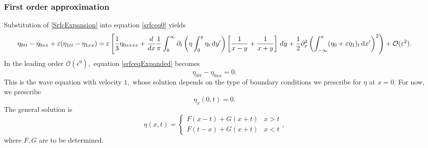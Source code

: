 \documentclass[10pt,reqno,oneside,a4paper, landscape]{article}
\begin{document}
\subsubsection*{First order approximation}
Substitution of \eqref{SrfcExpansion} into equation \eqref{srfceq0} yields
\begin{equation}\label{srfceqExpanded}
\eta_{0tt} - \eta_{0xx} +\varepsilon(\eta_{1tt} - \eta_{1xx})= \varepsilon \left[ \frac{1}{3}\eta_{0xxxx} +  \frac{d}{dx} \frac{1}{\pi} \int_0^\infty \partial_t \left( \eta \int^{y}_0\eta_{t} \,\mathrm{d} y' \right) \left[ \frac{1}{x-y} + \frac{1}{x+y} \right] \,\mathrm{d} y+ \frac{1}{2} \partial^2_x \left( \int^{x}_{-\infty} (\eta_0 + \varepsilon \eta_1)_t \,\mathrm{d} x' \right)^2\right) + \mathcal{O}(\varepsilon^2). 
\end{equation}
In the leading order $\mathcal{O}(\epsilon^0),$ equation \eqref{srfceqExpanded} becomes
\begin{equation}\label{1stOrderApprox}
\eta_{0tt} - \eta_{0xx} = 0.
\end{equation}
This is the wave equation with velocity $1,$ whose solution depends on the type of boundary conditions we prescribe for $\eta$ at $x=0.$ For now, we prescribe 
\[ \eta_x(0,t) = 0.\]
The general solution is 
\[ \eta(x,t) = \begin{cases} F(x-t) + G(x+t) & x>t \\ F(t-x) + G(x+t) & x<t \end{cases}, \] 
where $F,G$ are to be determined. 
\end{document}

